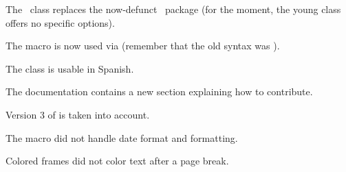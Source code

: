 \documentclass[10pt, a4paper]{tutodoc}
\begin{document}
\small

\begin{tdocbreak}
    \item The \thisproj\ class replaces the now-defunct \thisproj\ package (for the moment, the young class offers no specific options).

    \item The  macro is now used via  (remember that the old syntax was ).
\end{tdocbreak}


\begin{tdocnew}
    \item The class is usable in Spanish.

    \item The documentation contains a new section explaining how to contribute.
\end{tdocnew}


\begin{tdocfix}
    \item Version 3 of  is taken into account.

    \item The  macro did not handle date format and formatting.

    \item Colored frames did not color text after a page break.
\end{tdocfix}
\end{document}
